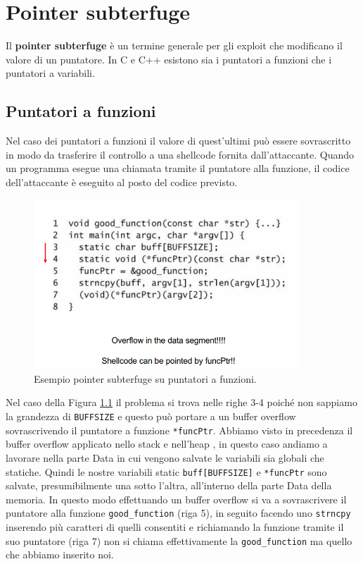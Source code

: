 \chapter{Pointer subterfuge}
Il \textbf{pointer subterfuge} è un termine generale per gli exploit che modificano il valore di un puntatore. In C e C++ esistono sia i puntatori a funzioni che i puntatori a variabili.
\section{Puntatori a funzioni}
Nel caso dei puntatori a funzioni il valore di quest'ultimi può essere sovrascritto in modo da trasferire il controllo a una shellcode fornita dall'attaccante. Quando un programma esegue una  chiamata tramite il puntatore alla funzione, il codice dell'attaccante è eseguito al posto del codice previsto.
\begin{figure}[H]
	\centering
	\includegraphics[width=10cm, keepaspectratio]{capitoli/secure_coding/img/cap_5/es_pointer_sub.png}
	\caption{Esempio pointer subterfuge su puntatori a funzioni.}\label{fig:es_poin_sub}
\end{figure}
Nel caso della Figura \ref{fig:es_poin_sub} il problema si trova nelle righe 3-4 poiché non sappiamo la grandezza di \verb|BUFFSIZE| e questo può portare a un buffer overflow sovrascrivendo il puntatore a funzione \verb|*funcPtr|. Abbiamo visto in precedenza il buffer overflow applicato nello stack e nell'heap , in questo caso andiamo a lavorare nella parte Data in cui vengono salvate le variabili sia globali che statiche. Quindi le nostre variabili static \verb|buff[BUFFSIZE]| e \verb|*funcPtr| sono salvate, presumibilmente una sotto l'altra, all'interno della parte Data della memoria. In questo modo effettuando un buffer overflow si va a sovrascrivere il puntatore alla funzione \verb|good_function| (riga 5), in seguito facendo uno \verb|strncpy| inserendo più caratteri di quelli consentiti e richiamando la funzione tramite il suo puntatore (riga 7) non si chiama effettivamente la \verb|good_function| ma quello che abbiamo inserito noi.
